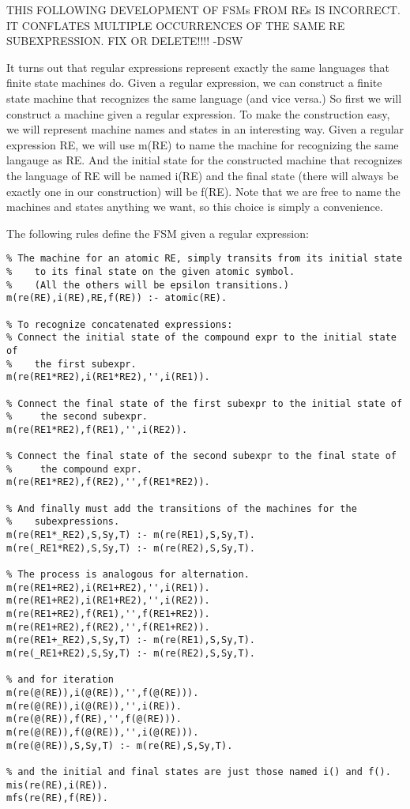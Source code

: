 THIS FOLLOWING DEVELOPMENT OF FSMs FROM REs IS INCORRECT.  IT
CONFLATES MULTIPLE OCCURRENCES OF THE SAME RE SUBEXPRESSION.  FIX OR
DELETE!!!!  -DSW

It turns out that regular expressions represent exactly the same
languages that finite state machines do.  Given a regular expression,
we can construct a finite state machine that recognizes the same
language (and vice versa.)  So first we will construct a machine given
a regular expression.  To make the construction easy, we will
represent machine names and states in an interesting way.  Given a
regular expression RE, we will use m(RE) to name the machine for
recognizing the same langauge as RE.  And the initial state for the
constructed machine that recognizes the language of RE will be named
i(RE) and the final state (there will always be exactly one in our
construction) will be f(RE).  Note that we are free to name the
machines and states anything we want, so this choice is simply a
convenience.

The following rules define the FSM given a regular expression:
\begin{verbatim}
% The machine for an atomic RE, simply transits from its initial state
%    to its final state on the given atomic symbol.
%    (All the others will be epsilon transitions.)
m(re(RE),i(RE),RE,f(RE)) :- atomic(RE).

% To recognize concatenated expressions:
% Connect the initial state of the compound expr to the initial state of
%    the first subexpr.
m(re(RE1*RE2),i(RE1*RE2),'',i(RE1)).

% Connect the final state of the first subexpr to the initial state of
%     the second subexpr.
m(re(RE1*RE2),f(RE1),'',i(RE2)).

% Connect the final state of the second subexpr to the final state of
%     the compound expr.
m(re(RE1*RE2),f(RE2),'',f(RE1*RE2)).

% And finally must add the transitions of the machines for the 
%    subexpressions.
m(re(RE1*_RE2),S,Sy,T) :- m(re(RE1),S,Sy,T).
m(re(_RE1*RE2),S,Sy,T) :- m(re(RE2),S,Sy,T).

% The process is analogous for alternation.
m(re(RE1+RE2),i(RE1+RE2),'',i(RE1)).
m(re(RE1+RE2),i(RE1+RE2),'',i(RE2)).
m(re(RE1+RE2),f(RE1),'',f(RE1+RE2)).
m(re(RE1+RE2),f(RE2),'',f(RE1+RE2)).
m(re(RE1+_RE2),S,Sy,T) :- m(re(RE1),S,Sy,T).
m(re(_RE1+RE2),S,Sy,T) :- m(re(RE2),S,Sy,T).

% and for iteration
m(re(@(RE)),i(@(RE)),'',f(@(RE))).
m(re(@(RE)),i(@(RE)),'',i(RE)).
m(re(@(RE)),f(RE),'',f(@(RE))).
m(re(@(RE)),f(@(RE)),'',i(@(RE))).
m(re(@(RE)),S,Sy,T) :- m(re(RE),S,Sy,T).

% and the initial and final states are just those named i() and f().
mis(re(RE),i(RE)).
mfs(re(RE),f(RE)).
\end{verbatim}

